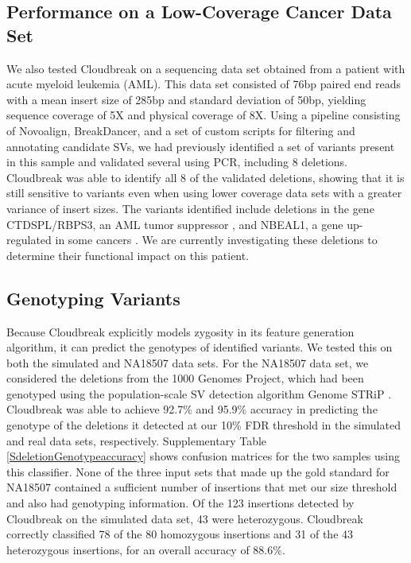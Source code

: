 \documentclass[11pt]{article}
\begin{document}
\subsection{Performance on a Low-Coverage Cancer Data Set}

We also tested Cloudbreak on a sequencing data set obtained from a patient with acute myeloid leukemia (AML). This data set consisted of 76bp paired end reads with a mean insert size of 285bp and standard deviation of 50bp, yielding sequence coverage of 5X and physical coverage of 8X. Using a pipeline consisting of Novoalign, BreakDancer, and a set of custom scripts for filtering and annotating candidate SVs, we had previously identified a set of variants present in this sample and validated several using PCR, including 8 deletions. Cloudbreak was able to identify all 8 of the validated deletions, showing that it is still sensitive to variants even when using lower coverage data sets with a greater variance of insert sizes. The variants identified include deletions in the gene CTDSPL/RBPS3, an AML tumor suppressor \autocite{Zheng:2012kk}, and NBEAL1, a gene up-regulated in some cancers \autocite{Chen:2004jo}. We are currently investigating these deletions to determine their functional impact on this patient. 

\subsection{Genotyping Variants}

Because Cloudbreak explicitly models zygosity in its feature generation algorithm, it can predict the genotypes of identified variants. We tested this on both the simulated and NA18507 data sets. For the NA18507 data set, we considered the deletions from the 1000 Genomes Project, which had been genotyped using the population-scale SV detection algorithm Genome STRiP \autocite{Handsaker:2011ki}. Cloudbreak was able to achieve 92.7\% and 95.9\% accuracy in predicting the genotype of the deletions it detected at our 10\% FDR threshold in the simulated and real data sets, respectively. Supplementary Table \ref{SdeletionGenotypeaccuracy} shows confusion matrices for the two samples using this classifier. None of the three input sets that made up the gold standard for NA18507 contained a sufficient number of insertions that met our size threshold and also had genotyping information. Of the 123 insertions detected by Cloudbreak on the simulated data set, 43 were heterozygous. Cloudbreak correctly classified 78 of the 80 homozygous insertions and 31 of the 43 heterozygous insertions, for an overall accuracy of 88.6\%.
\end{document}
